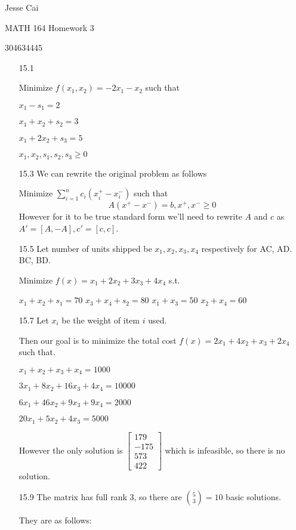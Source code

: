 \documentclass[10pt,a4paper]{article}
\newcommand\m[1]{\begin{bmatrix}#1\end{bmatrix}}
\begin{document}
Jesse Cai

MATH 164 Homework 3

304634445

\begin{enumerate}
    \item[15.1] 

     Minimize $f(x_1, x_2) = -2x_1 -x_2$ such that 

    $x_1 -s_1 = 2 $

    $x_1 + x_2 +s_2 = 3$

    $x_1 + 2x_2 + s_3 = 5$

    $x_1, x_2, s_1, s_2, s_3 \geq 0$

    \item [15.3] We can rewrite the original problem as follows
    
    Minimize $\sum_{i=1}^n c_i(x_i^+ - x_i^-)$ such that
    $$A(x^+ - x^-) = b, x^+, x^- \geq 0$$
    However for it to be true standard form we'll need to rewrite $A$ and $c$ as $A' = [A, -A], c'= [c, c]$.

    \item [15.5]
        Let number of units shipped be $x_1, x_2, x_3, x_4$ respectively for AC, AD. BC, BD.

        Minimize $f(x) = x_1 + 2x_2 + 3x_3 + 4x_4 $ s.t.

        $x_1 + x_2 + s_1 = 70$
        $x_3 + x_4 + s_2 = 80$
        $x_1 + x_3 = 50$
        $x_2 + x_4 = 60$
    
    \item [15.7] Let $x_i$ be the weight of item $i$ used.

    Then our goal is to minimize the total cost $f(x) = 2x_1 + 4x_2 + x_3 + 2x_4$ such that. 

    $x_1 + x_2 + x_3 + x_4 = 1000$

    $3x_1 + 8x_2 + 16x_3 + 4x_4 = 10000$

    $6x_1 + 46x_2 + 9x_3 + 9x_4 = 2000$

    $20x_1 + 5x_2 + 4x_3  = 5000$

    However the only solution is $\m{179 \\ -175 \\ 573 \\ 422}$ which is infeasible, so there is no solution.
    
    \item [15.9] The matrix has full rank $3$, so there are ${5 \choose 3}  = 10$ basic solutions.
    
        They are as follows:


\end{enumerate}
\end{document}
